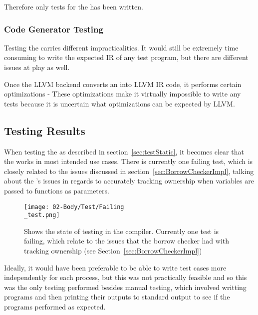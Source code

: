 Therefore only tests for the \borrowChecker{} has been written.

\subsubsection{Code Generator Testing}

Testing the \codeGen{} carries different impracticalities. It would still be
extremely time consuming to write the expected IR of any test program, but there are
different issues at play as well. 

Once the LLVM backend converts an \ast{} into LLVM IR code, it performs certain
optimizations - These optimizations make it virtually impossible to write any
\codeGen{}
tests because it is uncertain what optimizations can be expected by LLVM.

\subsection{Testing Results}

When testing the \borrowChecker{} as described in section~\ref{sec:testStatic}, it
becomes clear that the \borrowChecker{} works in most intended use cases. There is
currently one failing test, which is closely related to the issues discussed in
section~\ref{sec:BorrowCheckerImpl}, talking about the \borrowChecker's issues in
regards to accurately tracking ownership when variables are passed to functions as
parameters.

\begin{figure}[ht]
  \texttt{[image: 02-Body/Test/Failing\\\_test.png]}
  \caption{Shows the state of testing in the \lang{} compiler. Currently one test is
  failing, which relate to the issues that the borrow checker had with tracking
ownership (see Section~\ref{sec:BorrowCheckerImpl})}
  \label{fig:failTest}
\end{figure}

Ideally, it would have been preferable to be able to write test cases more
independently for each process, but this was not practically feasible and so this was
the only testing performed besides manual testing, which involved writting programs
and then printing their outputs to standard output to see if the programs performed
as expected.

\newpage
